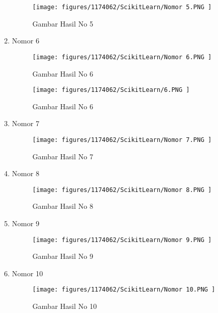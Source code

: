 \begin{enumerate}
\begin{enumerate}
\begin{figure}[H]
	\texttt{[image: figures/1174062/ScikitLearn/Nomor 5.PNG ]}
	\centering
	\caption{Gambar Hasil No 5 }
\end{figure}
	
\item Nomor 6
	\hfill\break
	
	
\begin{figure}[H]
	\texttt{[image: figures/1174062/ScikitLearn/Nomor 6.PNG ]}
	\centering
	\caption{Gambar Hasil No 6 }
\end{figure}
	
\begin{figure}[H]
	\texttt{[image: figures/1174062/ScikitLearn/6.PNG ]}
	\centering
	\caption{Gambar Hasil No 6 }
\end{figure}
	
\item Nomor 7
	\hfill\break
	
	
\begin{figure}[H]
	\texttt{[image: figures/1174062/ScikitLearn/Nomor 7.PNG ]}
	\centering
	\caption{Gambar Hasil No 7 }
\end{figure}
	
\item Nomor 8
	\hfill\break
	
	
\begin{figure}[H]
	\texttt{[image: figures/1174062/ScikitLearn/Nomor 8.PNG ]}
	\centering
	\caption{Gambar Hasil No 8 }
\end{figure}
	
\item Nomor 9
	\hfill\break
	
	
\begin{figure}[H]
	\texttt{[image: figures/1174062/ScikitLearn/Nomor 9.PNG ]}
	\centering
	\caption{Gambar Hasil No 9 }
\end{figure}
	
\item Nomor 10
	\hfill\break
	
	
\begin{figure}[H]
	\texttt{[image: figures/1174062/ScikitLearn/Nomor 10.PNG ]}
	\centering
	\caption{Gambar Hasil No 10 }
\end{figure}


\end{enumerate}
\end{enumerate}
